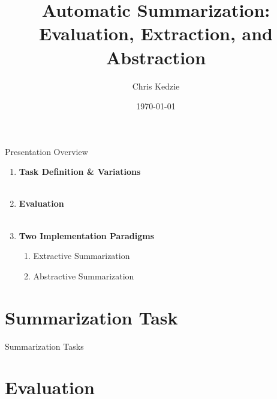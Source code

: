\documentclass[xcolor={table}]{beamer}
\title{Automatic Summarization: Evaluation, Extraction, and Abstraction}
\date{\today}
\author{Chris Kedzie}
\institute{Dept. of Computer Science, Columbia University}
\begin{document}
  \maketitle


\begin{frame}{Presentation Overview}

\begin{enumerate}
    \item \textbf{Task Definition \& Variations}
        ~\\~\\
    \item \textbf{Evaluation}
        ~\\~\\
    \item \textbf{Two Implementation Paradigms}
\begin{enumerate}
\item Extractive Summarization
\item Abstractive Summarization
\end{enumerate}
\end{enumerate}

\end{frame}


\section{Summarization Task}




\begin{frame}{Summarization Tasks}
\end{frame}





\section{Evaluation}
\end{document}
